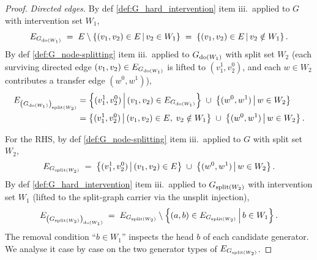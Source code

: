 \documentclass[main]{subfiles}
\begin{document}
\begin{proof}
\medskip\noindent\emph{Directed edges.}
By def \ref{def:G_hard_intervention} item iii.\ applied to $G$ with intervention set $W_1$,
\[
    E_{G_{\operatorname{do}(W_1)}}
    \;=\; E \setminus \left \{ (v_1, v_2) \in E \,\middle|\, v_2 \in W_1 \right \}
    \;=\; \left \{ (v_1, v_2) \in E \,\middle|\, v_2 \notin W_1 \right \}.
\]
By def \ref{def:G_node-splitting} item iii.\ applied to $G_{\operatorname{do}(W_1)}$ with split set $W_2$ (each surviving directed edge $(v_1, v_2) \in E_{G_{\operatorname{do}(W_1)}}$ is lifted to $(v_1^1, v_2^0)$, and each $w \in W_2$ contributes a transfer edge $(w^0, w^1)$),
\begin{align*}
    E_{\left ( G_{\operatorname{do}(W_1)} \right )_{\mathrm{split}(W_2)}}
    &= \left \{ (v_1^1, v_2^0) \,\middle|\, (v_1, v_2) \in E_{G_{\operatorname{do}(W_1)}} \right \} \;\cup\; \left \{ (w^0, w^1) \,\middle|\, w \in W_2 \right \} \\
    &= \left \{ (v_1^1, v_2^0) \,\middle|\, (v_1, v_2) \in E,\; v_2 \notin W_1 \right \} \;\cup\; \left \{ (w^0, w^1) \,\middle|\, w \in W_2 \right \}.
\end{align*}

For the RHS, by def \ref{def:G_node-splitting} item iii.\ applied to $G$ with split set $W_2$,
\[
    E_{G_{\mathrm{split}(W_2)}}
    \;=\; \left \{ (v_1^1, v_2^0) \,\middle|\, (v_1, v_2) \in E \right \} \;\cup\; \left \{ (w^0, w^1) \,\middle|\, w \in W_2 \right \}.
\]
By def \ref{def:G_hard_intervention} item iii.\ applied to $G_{\mathrm{split}(W_2)}$ with intervention set $W_1$ (lifted to the split-graph carrier via the unsplit injection),
\[
    E_{\left ( G_{\mathrm{split}(W_2)} \right )_{\operatorname{do}(W_1)}}
    \;=\; E_{G_{\mathrm{split}(W_2)}} \setminus \left \{ (a, b) \in E_{G_{\mathrm{split}(W_2)}} \,\middle|\, b \in W_1 \right \}.
\]
The removal condition ``$b \in W_1$'' inspects the head $b$ of each candidate generator. We analyse it case by case on the two generator types of $E_{G_{\mathrm{split}(W_2)}}$.


\end{proof}
\end{document}
